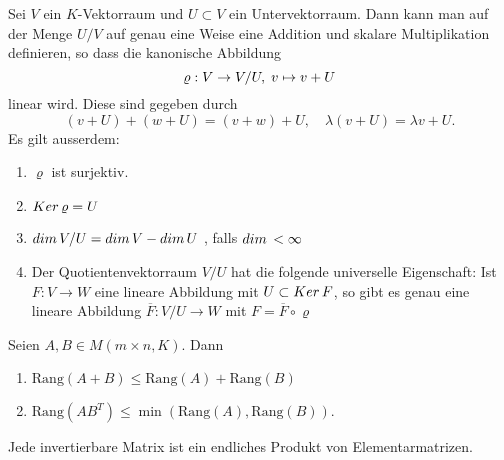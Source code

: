\documentclass[9pt, a4paper, twocolumn, landscape]{article}
\begin{document}
\begin{theorem}
Sei $V$ ein $K$-Vektorraum und $U \subset V$ ein Untervektorraum. Dann kann man auf der Menge $U/V$ auf genau eine Weise eine Addition und skalare Multiplikation definieren, so dass die kanonische Abbildung 
$$ \varrho : V \to V/U, \thickspace v \mapsto v + U$$
linear wird. Diese sind gegeben durch 
$$
(v+ U) + (w+ U) = (v + w) + U, \quad  \lambda (v+ U) = \lambda v + U.
$$
Es gilt ausserdem:
\begin{enumerate}
\item $\varrho$ ist surjektiv.
\item $Ker \thinspace \varrho = U$
\item $dim \thinspace V/U = dim\thinspace V - dim \thinspace U$ , falls $dim \thinspace < \infty$
\item Der Quotientenvektorraum $V/U$ hat die folgende universelle Eigenschaft: Ist $F: V\to W$ eine lineare Abbildung mit $U \subset Ker \thinspace F$, so gibt es genau eine lineare Abbildung $\overline{F}: V/U \to W$ mit $F = \overline{F}\circ \varrho$ 
\end{enumerate}
\end{theorem}

\begin{lemma}
Seien $A, B \in M( m \times n, K)$. Dann
\begin{enumerate}
\item $\mathrm{Rang}(A + B) \leq \mathrm{Rang}(A) + \mathrm{Rang}(B)$
\item $\mathrm{Rang}(AB^T) \leq \min( \mathrm{Rang}(A), \mathrm{Rang}(B))$.
\end{enumerate}
\end{lemma}

\begin{theorem}
Jede invertierbare Matrix ist ein endliches Produkt von Elementarmatrizen.
\end{theorem}
\end{document}
